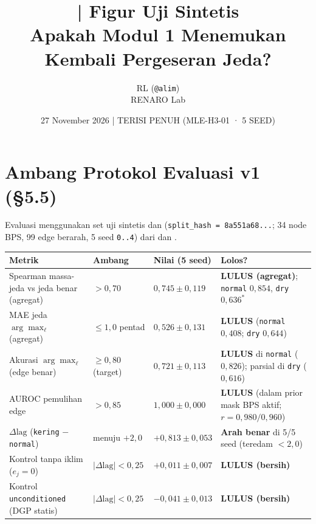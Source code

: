 \documentclass[11pt,a4paper]{article}
\title{\jobid{RL-H5-01} | Figur Uji Sintetis\\
\large Apakah Modul 1 Menemukan Kembali Pergeseran Jeda?}
\author{RL (\texttt{@alim}) \\ \small RENARO Lab}
\date{27 November 2026 \quad | \quad \textcolor{blue!70!black}{TERISI PENUH (MLE-H3-01 · 5 SEED)}}
\begin{document}
\maketitle

\section{Ambang Protokol Evaluasi v1 (\S5.5)}
Evaluasi menggunakan set uji sintetis  dan 
(\texttt{split\_hash = 8a551a68...}; 34 node BPS, 99 edge berarah, 5 seed \texttt{0..4}) dari
 dan .

\begin{table}[H]
\centering
\small
\begin{tabular}{@{}L{5.6cm}C{2.4cm}C{3.1cm}L{3.5cm}@{}}
\toprule
Metrik & Ambang & Nilai (5 seed) & Lolos? \\
\midrule
Spearman massa-jeda vs jeda benar (agregat) & $> 0{,}70$ & $0{,}745 \pm 0{,}119$ & \textbf{LULUS (agregat)}; \texttt{normal} $0{,}854$, \texttt{dry} $0{,}636^*$ \\
MAE jeda $\arg\max_\ell$ (agregat) & $\le 1{,}0$ pentad & $0{,}526 \pm 0{,}131$ & \textbf{LULUS} (\texttt{normal} $0{,}408$; \texttt{dry} $0{,}644$) \\
Akurasi $\arg\max_\ell$ (edge benar) & $\ge 0{,}80$ (target) & $0{,}721 \pm 0{,}113$ & \textbf{LULUS} di \texttt{normal} ($0{,}826$); parsial di \texttt{dry} ($0{,}616$) \\
AUROC pemulihan edge & $> 0{,}85$ & $1{,}000 \pm 0{,}000$ & \textbf{LULUS} (dalam prior mask BPS aktif; $r=0{,}980 / 0{,}960$) \\
$\Delta\text{lag}$ (\texttt{kering} $-$ \texttt{normal}) & menuju $+2{,}0$ & $+0{,}813 \pm 0{,}053$ & \textbf{Arah benar} di 5/5 seed (teredam $< 2{,}0$) \\
Kontrol tanpa iklim ($e_j = 0$) & $|\Delta\text{lag}| < 0{,}25$ & $+0{,}011 \pm 0{,}007$ & \textbf{LULUS (bersih)} \\
Kontrol \texttt{unconditioned} (DGP statis) & $|\Delta\text{lag}| < 0{,}25$ & $-0{,}041 \pm 0{,}013$ & \textbf{LULUS (bersih)} \\
\bottomrule
\end{tabular}
\end{table}
\end{document}
